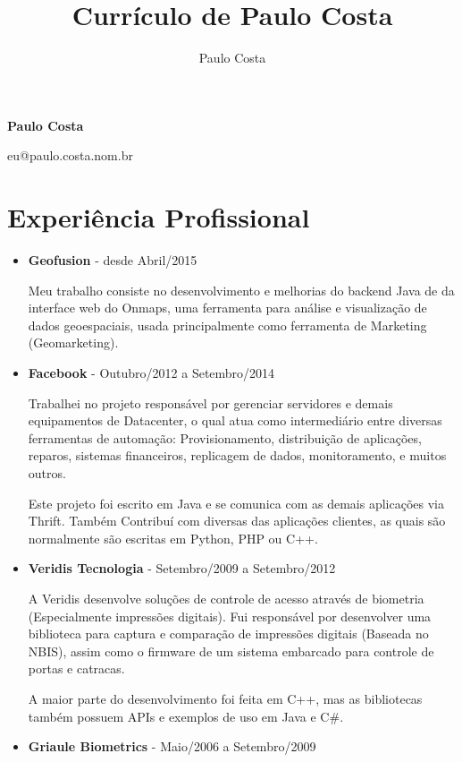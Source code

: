 \documentclass[a4paper,10pt]{article}
\title{Currículo de Paulo Costa}
\author{Paulo Costa}
\begin{document}
  
  \LARGE\textbf{Paulo Costa}

  \large eu@paulo.costa.nom.br



  \normalsize 

  \section{Experiência Profissional}
    \begin{itemize}
      \item
        \textbf{Geofusion} - desde Abril/2015
        
        Meu trabalho consiste no desenvolvimento e melhorias do backend Java de da interface web do Onmaps, uma ferramenta para análise e visualização de dados geoespaciais, usada principalmente como ferramenta de Marketing (Geomarketing).
        
      \item
        \textbf{Facebook} - Outubro/2012 a Setembro/2014
        
        Trabalhei no projeto responsável por gerenciar servidores e demais equipamentos de Datacenter, o qual atua como intermediário entre diversas ferramentas de automação: Provisionamento, distribuição de aplicações, reparos, sistemas financeiros, replicagem de dados, monitoramento, e muitos outros.
        
        Este projeto foi escrito em Java e se comunica com as demais aplicações via Thrift. Também Contribuí com diversas das aplicações clientes, as quais são normalmente são escritas em Python, PHP ou C++.

      \item
        \textbf{Veridis Tecnologia} - Setembro/2009 a Setembro/2012

        A Veridis desenvolve soluções de controle de acesso através de biometria (Especialmente impressões digitais). Fui responsável por desenvolver uma biblioteca para captura e comparação de impressões digitais (Baseada no NBIS), assim como o firmware de um sistema embarcado para controle de portas e catracas.
        
        A maior parte do desenvolvimento foi feita em C++, mas as bibliotecas também possuem APIs e exemplos de uso em Java e C\#.

      \item
        \textbf{Griaule Biometrics} - Maio/2006 a Setembro/2009
        

\end{itemize}
\end{document}
